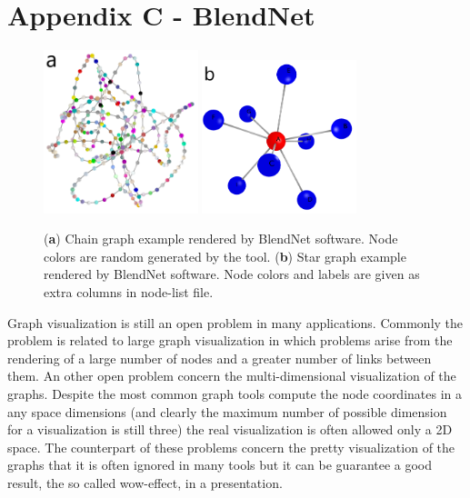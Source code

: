 \documentclass{standalone}
\begin{document}
\chapter*{Appendix C - BlendNet}


\begin{figure}[htbp]
\centering
\includegraphics[width=0.4\textwidth]{./img/cycle_graph.png}
\qquad\qquad
\includegraphics[width=0.4\textwidth]{./img/star_graph_node.png}
\caption{(\textbf{a}) Chain graph example rendered by BlendNet software.
Node colors are random generated by the tool.
(\textbf{b}) Star graph example rendered by BlendNet software.
Node colors and labels are given as extra columns in node-list file.
}
\label{supfig:example}
\end{figure}

Graph visualization is still an open problem in many applications.
Commonly the problem is related to large graph visualization in which problems arise from the rendering of a large number of nodes and a greater number of links between them.
An other open problem concern the multi-dimensional visualization of the graphs.
Despite the most common graph tools compute the node coordinates in a any space dimensions (and clearly the maximum number of possible dimension for a visualization is still three) the real visualization is often allowed only a 2D space.
The counterpart of these problems concern the pretty visualization of the graphs that it is often ignored in many tools but it can be guarantee a good result, the so called wow-effect, in a presentation.
\end{document}
